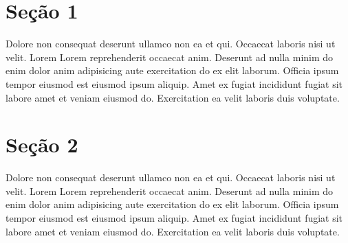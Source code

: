 \documentclass[12pt]{report}
\begin{document}
\SetWatermarkText{} %

\tableofcontents

\newpage


\section{Seção 1}

Dolore non consequat deserunt ullamco non ea et qui. Occaecat laboris nisi ut velit. Lorem Lorem reprehenderit occaecat anim. Deserunt ad nulla minim do enim dolor anim adipisicing aute exercitation do ex elit laborum. Officia ipsum tempor eiusmod est eiusmod ipsum aliquip. Amet ex fugiat incididunt fugiat sit labore amet et veniam eiusmod do. Exercitation ea velit laboris duis voluptate.

\section{Seção 2}

Dolore non consequat deserunt ullamco non ea et qui. Occaecat laboris nisi ut velit. Lorem Lorem reprehenderit occaecat anim. Deserunt ad nulla minim do enim dolor anim adipisicing aute exercitation do ex elit laborum. Officia ipsum tempor eiusmod est eiusmod ipsum aliquip. Amet ex fugiat incididunt fugiat sit labore amet et veniam eiusmod do. Exercitation ea velit laboris duis voluptate.
\end{document}

